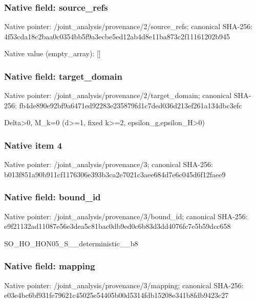 \documentclass[10pt,a4paper]{article}
\begin{document}
\subsubsection{Native field: source\_\allowbreak{}refs}
Native pointer: /joint\_\allowbreak{}analysis/provenance/2/source\_\allowbreak{}refs; canonical SHA-256: 4f53cda18c2baa0c0354bb5f9a3ecbe5ed12ab4d8e11ba873c2f11161202b945

Native value (empty\_\allowbreak{}array): []

\subsubsection{Native field: target\_\allowbreak{}domain}
Native pointer: /joint\_\allowbreak{}analysis/provenance/2/target\_\allowbreak{}domain; canonical SHA-256: fb4de890e92bf9a6471ed92283e235879fd1c7ded036d213ef261a134dbc3efc

\begingroup\raggedright\sloppy Delta>0,\allowbreak{} M\_\allowbreak{}k=\allowbreak{}0 (d>=\allowbreak{}1,\allowbreak{} fixed k>=\allowbreak{}2,\allowbreak{} epsilon\_\allowbreak{}g,\allowbreak{}epsilon\_\allowbreak{}H>0)\par\endgroup

\subsubsection{Native item 4}
Native pointer: /joint\_\allowbreak{}analysis/provenance/3; canonical SHA-256: b013f851a90b911cf1176306e393b3ca2e7021c3aee684d7e6c045d6f12faee9

\subsubsection{Native field: bound\_\allowbreak{}id}
Native pointer: /joint\_\allowbreak{}analysis/provenance/3/bound\_\allowbreak{}id; canonical SHA-256: e9f21132ad11087e56e3dea5c81bac0db9ed0c6b83d3dd4076fc7e5b59dcc658

\begingroup\raggedright\sloppy SO\_\allowbreak{}HO\_\allowbreak{}HON05\_\allowbreak{}S\_\allowbreak{}\_\allowbreak{}deterministic\_\allowbreak{}\_\allowbreak{}b8\par\endgroup

\subsubsection{Native field: mapping}
Native pointer: /joint\_\allowbreak{}analysis/provenance/3/mapping; canonical SHA-256: e03e4bc6bf931fe79621c45025e54405b00d5314fdb15208e341b8fdb9423c27
\end{document}
